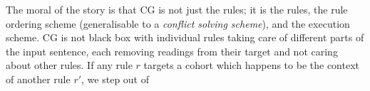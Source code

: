 The moral of the story is that CG is not just the rules; it is the rules, the rule ordering scheme (generalisable to a \emph{conflict solving scheme}), and the execution scheme. CG is not black box with individual rules taking care of different parts of the input sentence, each removing readings from their target and not caring about other rules. 
If any rule $r$ targets a cohort which happens to be the context of another rule $r'$, we step out of 



 








